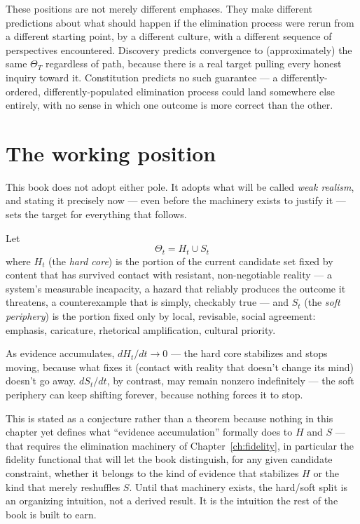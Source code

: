 These positions are not merely different emphases. They make different predictions about what should happen if the elimination process were rerun from a different starting point, by a different culture, with a different sequence of perspectives encountered. Discovery predicts convergence to (approximately) the same $\Theta_T$ regardless of path, because there is a real target pulling every honest inquiry toward it. Constitution predicts no such guarantee --- a differently-ordered, differently-populated elimination process could land somewhere else entirely, with no sense in which one outcome is more correct than the other.

\section*{The working position}

This book does not adopt either pole. It adopts what will be called \emph{weak realism}, and stating it precisely now --- even before the machinery exists to justify it --- sets the target for everything that follows.

\begin{definition}
Let
\[
\Theta_t = H_t \cup S_t
\]
where $H_t$ (the \emph{hard core}) is the portion of the current candidate set fixed by content that has survived contact with resistant, non-negotiable reality --- a system's measurable incapacity, a hazard that reliably produces the outcome it threatens, a counterexample that is simply, checkably true --- and $S_t$ (the \emph{soft periphery}) is the portion fixed only by local, revisable, social agreement: emphasis, caricature, rhetorical amplification, cultural priority.
\end{definition}

\begin{conjecture}
As evidence accumulates, $dH_t/dt \to 0$ --- the hard core stabilizes and stops moving, because what fixes it (contact with reality that doesn't change its mind) doesn't go away. $dS_t/dt$, by contrast, may remain nonzero indefinitely --- the soft periphery can keep shifting forever, because nothing forces it to stop.
\end{conjecture}

This is stated as a conjecture rather than a theorem because nothing in this chapter yet defines what ``evidence accumulation'' formally does to $H$ and $S$ --- that requires the elimination machinery of Chapter~\ref{ch:fidelity}, in particular the fidelity functional that will let the book distinguish, for any given candidate constraint, whether it belongs to the kind of evidence that stabilizes $H$ or the kind that merely reshuffles $S$. Until that machinery exists, the hard/soft split is an organizing intuition, not a derived result. It is the intuition the rest of the book is built to earn.

